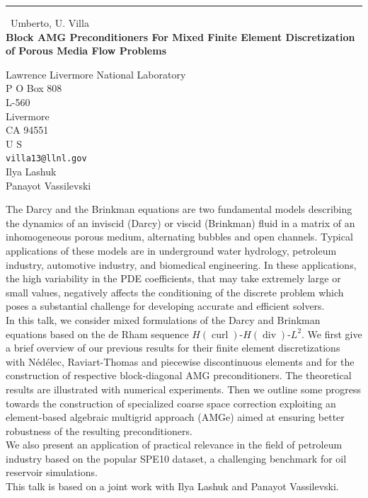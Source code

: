 \documentclass{report}
\begin{document}
\begin{center}
\rule{6in}{1pt} \
{\large Umberto, U. Villa \\
{\bf Block AMG Preconditioners For Mixed Finite Element Discretization of Porous Media Flow Problems}}

Lawrence Livermore National Laboratory \\ P O Box 808 \\ L-560 \\ Livermore \\ CA 94551 \\ U S
\\
{\tt villa13@llnl.gov}\\
Ilya Lashuk\\
Panayot Vassilevski\end{center}

\newcommand{\curl}{\operatorname{curl}}
\renewcommand{\div}{\operatorname{div}}
\def\Nedelec{N\'ed\'elec}
\newcommand{\hypre}{{\em hypre }}

The Darcy and the Brinkman equations are two fundamental models
describing the dynamics of an inviscid (Darcy) or viscid (Brinkman) fluid
in a matrix of an inhomogeneous porous medium, alternating bubbles and
open channels. Typical applications of these models are in underground
water hydrology, petroleum industry, automotive industry, and biomedical
engineering. In these applications, the high variability in the PDE
coefficients, that may take extremely large or small values, negatively
affects the conditioning of the discrete problem which poses a
substantial challenge for developing accurate and efficient solvers.\\
In this talk, we consider mixed formulations of the Darcy and Brinkman
equations based on the de Rham sequence $H(\curl)$-$H(\div)$-$L^2$. We
first give a brief overview of our previous results for
their finite element discretizations with \Nedelec, Raviart-Thomas and
piecewise discontinuous elements and for the construction of respective
block-diagonal AMG preconditioners. The theoretical results are
illustrated with numerical experiments.
Then we outline some progress towards the construction of specialized
coarse space correction
exploiting an element-based algebraic multigrid approach (AMGe) aimed at
ensuring better robustness of the resulting preconditioners.\\
We also present an application of practical relevance in the field of
petroleum industry based on the popular SPE10 dataset, a challenging
benchmark for oil reservoir simulations.\\

This talk is based on a joint work with Ilya Lashuk and Panayot Vassilevski.
\end{document}
